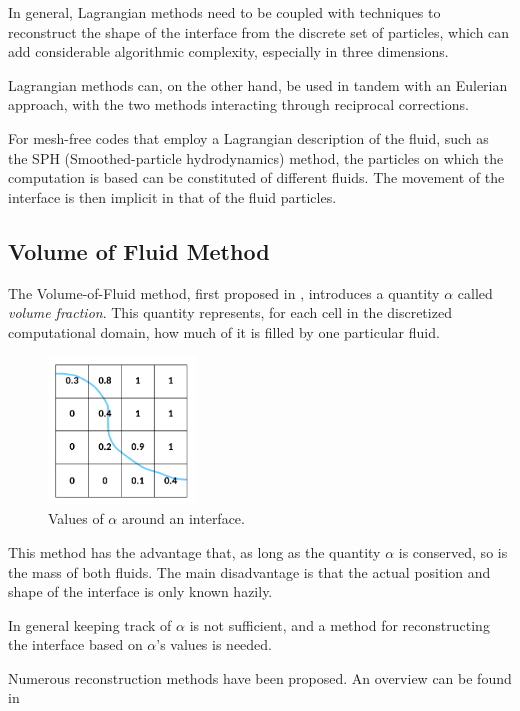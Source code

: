 \documentclass[11pt, a4paper, oneside, openany]{book}
\begin{document}
In general, Lagrangian methods need to be coupled with techniques to reconstruct the shape of the interface from the discrete set of particles, which can add considerable algorithmic complexity, especially in three dimensions.\par
Lagrangian methods can, on the other hand, be used in tandem with an Eulerian approach, with the two methods interacting through reciprocal corrections.\par
For mesh-free codes that employ a Lagrangian description of the fluid, such as the SPH (Smoothed-particle hydrodynamics) method, the particles on which the computation is based can be constituted of different fluids. The movement of the interface is then implicit in that of the fluid particles.
\subsection{Volume of Fluid Method}
The Volume-of-Fluid method, first proposed in \cite{hirt1981volume}, introduces a quantity $\alpha$ called \textit{volume fraction}. This quantity represents, for each cell in the discretized computational domain, how much of it is filled by one particular fluid.\par 
\begin{figure}[!ht]
	\centering
	\includegraphics[width=0.35\textwidth]{VOF.pdf}
	\caption[Volume of Fluid]{Values of $\alpha$ around an interface.}
	\label{VOF}
\end{figure}\noindent
This method has the advantage that, as long as the quantity $\alpha$ is conserved, so is the mass of both fluids. The main disadvantage is that the actual position and shape of the interface is only known hazily.\par
In general keeping track of $\alpha$ is not sufficient, and a method for reconstructing the interface based on $\alpha$'s values is needed.\par
Numerous reconstruction methods have been proposed. An overview can be found in \cite{pilliod2004second} 
\end{document}
